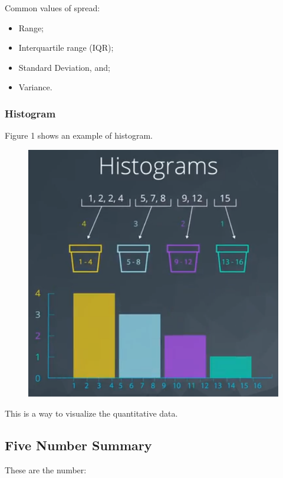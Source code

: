 \documentclass[]{book}
\providecommand{\tightlist}{%
  \setlength{\itemsep}{0pt}\setlength{\parskip}{0pt}}
\begin{document}
Common values of spread:

\begin{itemize}
\tightlist
\item
  Range;
\item
  Interquartile range (IQR);
\item
  Standard Deviation, and;
\item
  Variance.
\end{itemize}

\subsubsection{Histogram}\label{histogram}

Figure 1 shows an example of histogram.

\begin{figure}
\centering
\includegraphics{01-img/c4_l2_01.png}
\caption{}
\end{figure}

This is a way to visualize the quantitative data.

\subsection{Five Number Summary}\label{five-number-summary}

These are the number:
\end{document}
